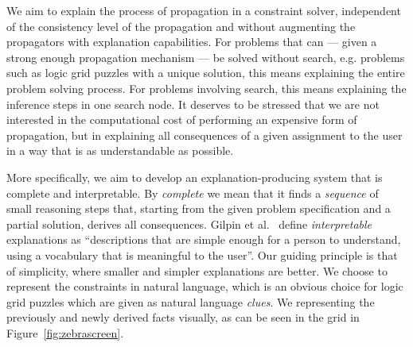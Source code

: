 We aim to explain the process of propagation in a constraint solver, independent of the consistency level of the propagation and without augmenting the propagators with explanation capabilities.
For problems that can --- given a strong enough propagation mechanism --- be solved without search, e.g. problems such as logic grid puzzles with a unique solution, this means explaining the entire problem solving process. 
For problems involving search, this means explaining the inference steps  in one search node. 
It deserves to be stressed that we are not interested in the computational cost of performing an expensive form of propagation, but in explaining all consequences of a given assignment to the user in a way that is as understandable as possible. 

More specifically, we aim to develop an explanation-producing system that is complete and interpretable. 
By \textit{complete} we mean that it finds a \textit{sequence} of small reasoning steps that, starting from the given problem specification and a partial solution, derives all consequences. 
%
Gilpin et al.~\cite{DBLP:conf/dsaa/GilpinBYBSK18} define \textit{interpretable} explanations as ``descriptions that are simple enough for a person to understand, using a vocabulary that is meaningful to the user''. 
Our guiding principle is that of simplicity, where smaller and simpler explanations are better. %
We choose to represent the constraints in natural language, which is an obvious choice for logic grid puzzles which are given as natural language \textit{clues}. 
We representing the previously and newly derived facts visually, as can be seen in the grid in Figure~\ref{fig:zebrascreen}.

